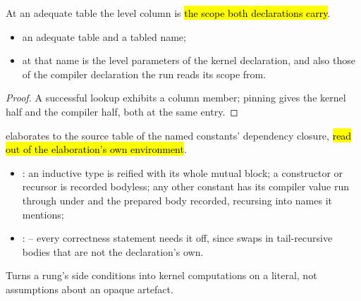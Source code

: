 \begin{lemma}\label{lem:Witness-SourceTableAdequate-levels-eq}
 \leanok
{}
 At an adequate table the level column is \hl{the scope both declarations carry}.
\begin{itemize}
\item {} an adequate table and a tabled name;
\item {}  at that name is the level parameters of the kernel declaration,
and also those of the compiler declaration the run reads its scope from.
\end{itemize}
\end{lemma}

\begin{proof} \leanok
{}
 A successful lookup exhibits a column member; pinning gives the kernel half and
 the compiler half, both at the same entry.
\end{proof}

\begin{definition}\label{def:Witness-elabReify}
 \leanok
{}
  elaborates to the source table of the named constants'
dependency closure, \hl{read out of the elaboration's own environment}.
\begin{itemize}
\item {}: an inductive type is reified with its whole mutual block; a constructor or
recursor is recorded bodyless; any other constant has its compiler value run through
 under  and the prepared body recorded, recursing into names
it mentions;
\item {}:  -- every correctness statement needs it off, since
 swaps in tail-recursive bodies that are not the declaration's own.
\end{itemize}
 Turns a rung's side conditions into kernel computations on a literal, not assumptions
about an opaque artefact.
\end{definition}

